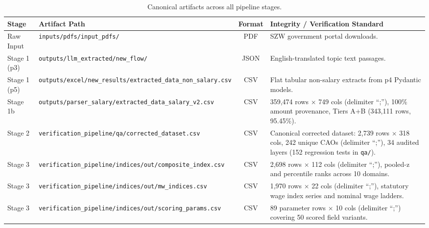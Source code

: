 \begin{table}[!htbp]
\centering
\small
\begin{tabularx}{\textwidth}{l >{\raggedright\arraybackslash}p{5.4cm} c X}
\toprule
\textbf{Stage} & \textbf{Artifact Path} & \textbf{Format} & \textbf{Integrity / Verification Standard} \\
\midrule
Raw Input & \nolinkurl{inputs/pdfs/input_pdfs/} & PDF & SZW government portal downloads. \\
Stage 1 (p3) & \nolinkurl{outputs/llm_extracted/new_flow/} & JSON & English-translated topic text passages. \\
Stage 1 (p5) & \nolinkurl{outputs/excel/new_results/extracted_data_non_salary.csv} & CSV & Flat tabular non-salary extracts from p4 Pydantic models. \\
Stage 1b & \nolinkurl{outputs/parser_salary/extracted_data_salary_v2.csv} & CSV & 359,474 rows $\times$ 749 cols (delimiter ``;''), 100\% amount provenance, Tiers A+B (343,111 rows, 95.45\%). \\
Stage 2 & \nolinkurl{verification_pipeline/qa/corrected_dataset.csv} & CSV & Canonical corrected dataset: 2,739 rows $\times$ 318 cols, 242 unique CAOs (delimiter ``;''), 34 audited layers (152 regression tests in \nolinkurl{qa/}). \\
Stage 3 & \nolinkurl{verification_pipeline/indices/out/composite_index.csv} & CSV & 2,698 rows $\times$ 112 cols (delimiter ``;''), pooled-z and percentile ranks across 10 domains. \\
Stage 3 & \nolinkurl{verification_pipeline/indices/out/mw_indices.csv} & CSV & 1,970 rows $\times$ 22 cols (delimiter ``;''), statutory wage index series and nominal wage ladders. \\
Stage 3 & \nolinkurl{verification_pipeline/indices/out/scoring_params.csv} & CSV & 89 parameter rows $\times$ 10 cols (delimiter ``;'') covering 50 scored field variants. \\
\bottomrule
\end{tabularx}
\caption{Canonical artifacts across all pipeline stages.}
\label{tab:canonical-artifacts}
\end{table}
